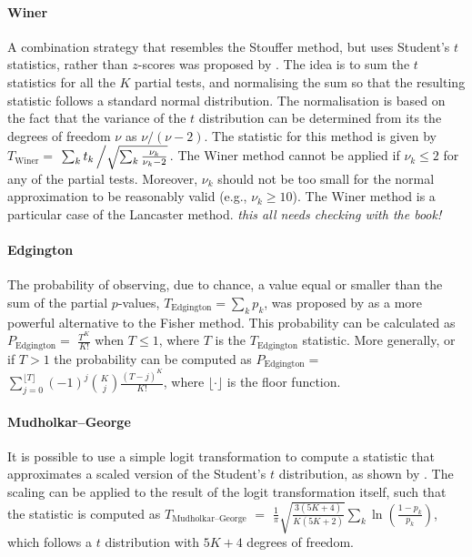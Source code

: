 \paragraph{Winer} A combination strategy that resembles the Stouffer method, but uses Student's $t$ statistics, rather than $z$-scores was proposed by \citet{Winer1962}. The idea is to sum the $t$ statistics for all the $K$ partial tests, and normalising the sum so that the resulting statistic follows a standard normal distribution. The normalisation is based on the fact that the variance of the $t$ distribution can be determined from its the degrees of freedom $\nu$ as $\nu/(\nu-2)$. The statistic for this method is given by $T_{\text{Winer}}=$ $\sum_{k}t_{k}\left/\sqrt{\sum_{k}\frac{\nu_{k}}{\nu_{k}-2}}\right.$. The Winer method cannot be applied if $\nu_{k} \leqslant 2$ for any of the partial tests. Moreover, $\nu_{k}$ should not be too small for the normal approximation to be reasonably valid (e.g., $\nu_{k} \geqslant 10$). The Winer method is a particular case of the Lancaster method. {\color{orange} \emph{this all needs checking with the book!}}

\paragraph{Edgington} The probability of observing, due to chance, a value equal or smaller than the sum of the partial $p$-values, $T_{\text{Edgington}}=\sum_{k} p_{k}$, was proposed by \citet{Edgington1972} as a more powerful alternative to the Fisher method. This probability can be calculated as $P_{\text{Edgington}} =$ $\frac{T^K}{K!}$ when $T \leqslant 1$, where $T$ is the $T_{\text{Edgington}}$ statistic. More generally, or if $T>1$ the probability can be computed as $P_{\text{Edgington}} =$ $\sum_{j=0}^{\lfloor T \rfloor}(-1)^j \binom{K}{j}\frac{(T-j)^K}{K!}$, where $\lfloor \cdot \rfloor$ is the floor function.

\paragraph{Mudholkar--George} It is possible to use a simple logit transformation to compute a statistic that approximates a scaled version of the Student's $t$ distribution, as shown by \citet{Mudholkar1979}. The scaling can be applied to the result of the logit transformation itself, such that the statistic is computed as $T_{\text{Mudholkar--George}}$ $=$ $\frac{1}{\pi}\sqrt{\frac{3(5K+4)}{K(5K+2)}}\sum_{k} \ln\left(\frac{1-p_{k}}{p_{k}}\right)$, which follows a $t$ distribution with $5K+4$ degrees of freedom.

